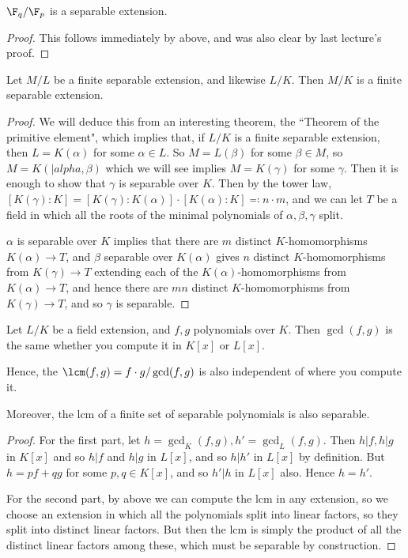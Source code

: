 \documentclass[a4paper, 10pt, twocolumn]{amsart}
\begin{document}
\begin{corollary}
$\F_q / \F_p$ is a separable extension.
\end{corollary}
\begin{proof}
This follows immediately by above, and was also clear by last lecture's proof.
\end{proof}
\begin{proposition}
Let $M/L$ be a finite separable extension, and likewise $L/K$. Then $M/K$ is a finite separable extension.
\end{proposition}
\begin{proof}
We will deduce this from an interesting theorem, the ``Theorem of the primitive element", which implies that, if $L/K$ is a finite separable extension, then $L = K(\alpha)$ for some $\alpha \in L$. So $M = L(\beta)$ for some $\beta \in M$, so $M = K(|alpha, \beta)$ which we will see implies $M = K(\gamma)$ for some $\gamma$. Then it is enough to show that $\gamma$ is separable over $K$. Then by the tower law, $[K(\gamma):K] = [K(\gamma):K(\alpha)]\cdot [K(\alpha):K] \eqqcolon n\cdot m$, and we can let $T$ be a field in which all the roots of the minimal polynomials of $\alpha, \beta, \gamma$ split.

$\alpha$ is separable over $K$ implies that there are $m$ distinct $K$-homomorphisms $K(\alpha) \to T$, and $\beta$ separable over $K(\alpha)$ gives $n$ distinct $K$-homomorphisms from $K(\gamma) \to T$ extending each of the $K(\alpha)$-homomorphisms from $K(\alpha)\to T$, and hence there are $mn$ distinct $K$-homomorphisms from $K(\gamma) \to T$, and so $\gamma$ is separable.
\end{proof}

\begin{lemma}
Let $L/K$ be a field extension, and $f, g$ polynomials over $K$. Then $\gcd(f,g)$ is the same whether you compute it in $K[x]$ or $L[x]$.

Hence, the $\lcm(f,g) = f\cdot g / \gcd(f,g)$ is also independent of where you compute it.

Moreover, the lcm of a finite set of separable polynomials is also separable.
\end{lemma}
\begin{proof}
For the first part, let $h=\gcd_K(f,g), h' = \gcd_L(f,g)$. Then $h|f, h|g$ in $K[x]$ and so $h|f$ and $h|g$ in $L[x]$, and so $h|h'$ in $L[x]$ by definition. But $h = pf+qg$ for some $p,q \in K[x]$, and so $h'|h$ in $L[x]$ also. Hence $h=h'$.

For the second part, by above we can compute the lcm in any extension, so we choose an extension in which all the polynomials split into linear factors, so they split into distinct linear factors. But then the lcm is simply the product of all the distinct linear factors among these, which must be separable by construction.
\end{proof}
\end{document}
